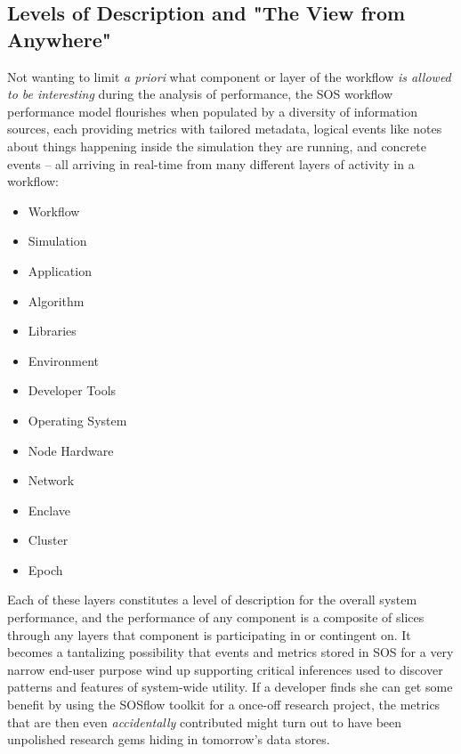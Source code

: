 \subsection{Levels of Description and "The View from Anywhere"}
Not wanting to limit \textit{a priori} what component or layer of the
workflow \textit{is allowed to be interesting} during the analysis of
performance, the SOS workflow performance model flourishes when
populated by a diversity of information sources, each providing
metrics with tailored metadata, logical events like notes about things
happening inside the simulation they are running, and concrete events
-- all arriving in real-time from many different layers of activity in
a workflow:
\begin{itemize}
    \item Workflow
    \item Simulation
    \item Application
    \item Algorithm
    \item Libraries
    \item Environment
    \item Developer Tools
    \item Operating System
    \item Node Hardware
    \item Network
    \item Enclave
    \item Cluster
    \item Epoch	
\end{itemize}

Each of these layers constitutes a level of description for the
overall system performance, and the performance of any component is a
composite of slices through any layers that component is participating
in or contingent on. It becomes a tantalizing possibility that events
and metrics stored in SOS for a very narrow end-user purpose wind up
supporting critical inferences used to discover patterns and features
of system-wide utility. If a developer finds she can get some benefit
by using the SOSflow toolkit for a once-off research project, the
metrics that are then even \textit{accidentally} contributed might
turn out to have been unpolished research gems hiding in tomorrow's data
stores.

